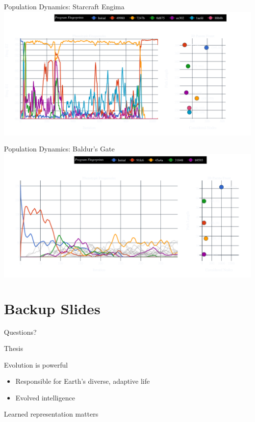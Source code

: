 \documentclass[aspectratio=169]{beamer}
\begin{document}
\begin{frame}{Population Dynamics: Starcraft Engima}
    \includegraphics[width=1.0\linewidth, keepaspectratio]{figures/pheno.pdf}
\end{frame}

\begin{frame}{Population Dynamics: Baldur's Gate}
    \includegraphics[width=1.0\linewidth, keepaspectratio]{figures/baldurs_pheno_60.pdf}
\end{frame}

\appendix %
\section*{Backup Slides}
\begin{frame}
  \centering
  \vfill
  {\fontsize{40}{50}\selectfont Questions?}
  \vfill
\end{frame}

\begin{frame}
  \centering
  \printbibliography
\end{frame}

\begin{frame}[plain]{Thesis}
    \begin{vfilleditems}
      \item {\Huge Evolution is powerful}
        \begin{itemize}
          \item {\Medium Responsible for Earth's diverse, adaptive life}
          \item {\Medium \color{pureminimalistic@text@red} Evolved intelligence}
        \end{itemize}
      \item {\Huge Learned representation matters}
    \end{vfilleditems}
\end{frame}
\end{document}

